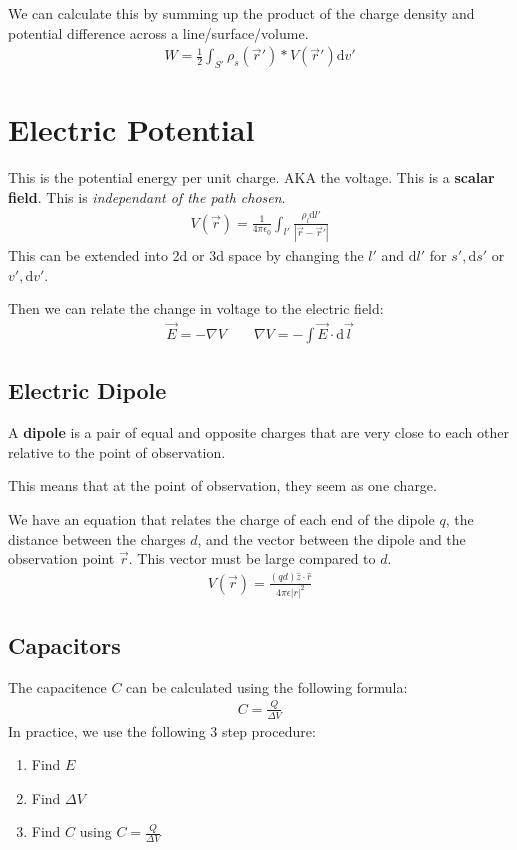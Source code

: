 \documentclass[12pt,letterpaper]{article} \usepackage{amsmath} \usepackage{graphicx} \usepackage[margin=1in]{geometry} \usepackage{longtable}  \usepackage{amssymb}
\begin{document}
	We can calculate this by summing up the product of the charge density and potential difference across a line/surface/volume.
	\begin{align*}
		W = \frac{1}{2}\int_{S\prime}\rho_s(\vec r\prime)*V(\vec r\prime) \mathrm d v\prime
	\end{align*}
	
	\section{Electric Potential}
	This is the potential energy per unit charge. AKA the voltage. This is a \textbf{scalar field}. This is \textit{independant of the path chosen}. 
	\begin{align*}
		V(\vec r) = \frac{1}{4\pi \epsilon _0} \int_{l\prime }\frac{\rho _l \mathrm d l\prime}{|\vec r-\vec r\prime| }
	\end{align*}
	This can be extended into 2d or 3d space by changing the $l\prime$ and $\mathrm d l\prime$ for $s\prime, \mathrm d s\prime$ or $v\prime, \mathrm d v\prime$.
	
	Then we can relate the change in voltage to the electric field:
	\begin{align*}
		\vec E = -\nabla V \qquad \nabla V = -\int \vec E\cdot \mathrm d \vec l
	\end{align*}

	\subsection{Electric Dipole}
	A \textbf{dipole} is a pair of equal and opposite charges that are very close to each other relative to the point of observation.
	
	This means that at the point of observation, they seem as one charge. 
	
	We have an equation that relates the charge of each end of the dipole $q$, the distance between the charges $d$, and the vector between the dipole and the observation point $\vec r$. This vector must be large compared to $d$.
	\begin{align*}
		V(\vec r) = \frac{(qd) \hat z \cdot \hat r}{4\pi \epsilon |r|^2}
	\end{align*}

	\subsection{Capacitors}
	The capacitence $C$ can be calculated using the following formula:
	\begin{align*}
		C=\frac{Q}{\Delta V}
	\end{align*}
	In practice, we use the following 3 step procedure:
	\begin{enumerate}[noitemsep]
		\item Find $E$
		\item Find $\Delta V$
		\item Find $C$ using $C=\frac{Q}{\Delta V} $
	\end{enumerate}
	
\end{document}
